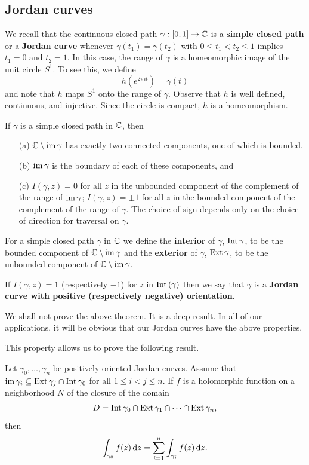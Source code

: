 \subsection{Jordan curves}
We recall that the continuous closed path $\gamma:[0,1]\to\mathbb{C}$ is a \textbf{simple closed path} or a \textbf{Jordan curve} whenever $\gamma(t_1)=\gamma(t_2)$ with $0\leq t_1<t_2\leq 1$ implies $t_1=0$ and $t_2=1$. In this case, the range of $\gamma$ is a homeomorphic image of the unit circle $S^1$. To see this, we define
\[h(e^{2\pi it})=\gamma(t)\]
and note that $h$ maps $S^1$ onto the range of $\gamma$. Observe that $h$ is well defined, continuous, and injective. Since the circle is compact, $h$ is a homeomorphism.
\begin{theorem}
If $\gamma$ is a simple closed path in $\mathbb{C}$, then
\begin{itemize}
\item[(a)] $\mathbb{C}\setminus\mathrm{im}\,\gamma$ has exactly two connected components, one of which is bounded.
\item[(b)] $\mathrm{im}\,\gamma$ is the boundary of each of these components, and
\item[(c)] $I(\gamma,z)=0$ for all $z$ in the unbounded component of the complement of the range of $\mathrm{im}\,\gamma$; $I(\gamma,z)=\pm 1$ for all $z$ in the bounded component of the complement of the range of $\gamma$. The choice of sign depends only on the choice of direction for traversal on $\gamma$.
\end{itemize}
\end{theorem}
\begin{definition}
For a simple closed path $\gamma$ in $\mathbb{C}$ we define the \textbf{interior} of $\gamma$, $\mathrm{Int}\,\gamma$, to be the bounded component of $\mathbb{C}\setminus\mathrm{im}\,\gamma$ and the \textbf{exterior} of $\gamma$, $\mathrm{Ext}\,\gamma$, to be the unbounded component of $\mathbb{C}\setminus\mathrm{im}\,\gamma$.\par
If $I(\gamma,z)=1$ (respectively $-1$) for $z$ in $\mathrm{Int}\,(\gamma)$ then we say that $\gamma$ is a \textbf{Jordan curve with positive (respectively negative) orientation}.
\end{definition}
We shall not prove the above theorem. It is a deep result. In all of our applications, it will be obvious that our Jordan curves have the above properties.\par
This property allows us to prove the following result.
\begin{theorem}\label{Cauchy integral theorem extended}
Let $\gamma_0,\dots,\gamma_n$ be positively oriented Jordan curves. Assume that $\mathrm{im}\,\gamma_i\subseteq\mathrm{Ext}\,\gamma_j\cap\mathrm{Int}\,\gamma_0$ for all $1\leq i<j\leq n$. If $f$ is a holomorphic function on a neighborhood $N$ of the closure of the domain
\[D=\mathrm{Int}\,\gamma_0\cap\mathrm{Ext}\,\gamma_1\cap\cdots\cap\mathrm{Ext}\,\gamma_n,\]
then
\[\int_{\gamma_0}f(z)\mathop{}\!\mathrm{d} z=\sum_{i=1}^{n}\int_{\gamma_i}f(z)\mathop{}\!\mathrm{d} z.\]
\end{theorem}
